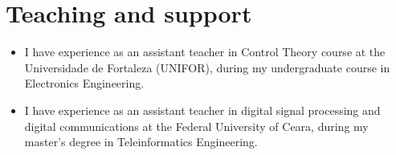 \section{Teaching and support}
\begin{itemize}[leftmargin=0.15in, label={}] %
    \item I have experience as an assistant teacher in Control Theory course at the Universidade de Fortaleza (UNIFOR), during my undergraduate course in Electronics Engineering.
    \item I have experience as an assistant teacher in digital signal processing and digital communications at the Federal University of Ceara, during my master's degree in Teleinformatics Engineering. 
\end{itemize}
